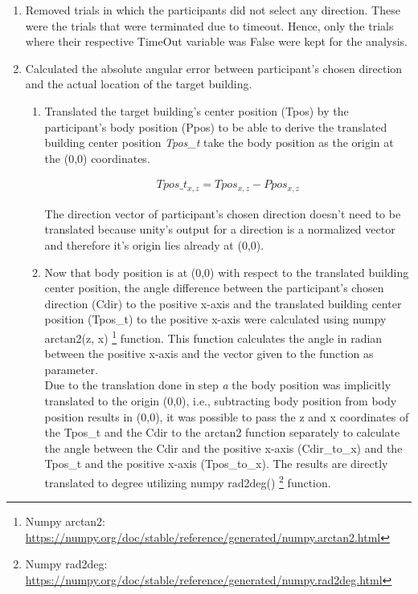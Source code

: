\begin{enumerate}
	\item Removed trials in which the participants did not select any direction. These were the trials that were terminated due to timeout. Hence, only the trials where their respective TimeOut variable was False were kept for the analysis.
	\item Calculated the absolute angular error between participant's chosen direction and the actual location of the target building.
	
	\begin{enumerate}
		\item Translated the target building's center position {\emphasize(Tpos)} by the participant's body position {\emphasize(Ppos)} to be able to derive the translated building center position {\emph{Tpos\_t}} take the body position as the origin at the (0,0) coordinates.
		
			\begin{align*}
				Tpos\_t_{x,z}= Tpos_{x,z} - Ppos_{x,z}
			\end{align*}
		
		The direction vector of participant's chosen direction doesn't need to be translated because unity's output for a direction is a normalized vector and therefore it's origin lies already at (0,0).\\
		
		\item Now that body position is at (0,0) with respect to the translated building center position, the angle difference between the participant's chosen direction {\emphasize(Cdir)} to the positive x-axis and the translated building center position {\emphasize(Tpos\_t)} to the positive x-axis were calculated using numpy arctan2(z, x) \footnote{Numpy arctan2: \href{https://numpy.org/doc/stable/reference/generated/numpy.arctan2.html}{https://numpy.org/doc/stable/reference/generated/numpy.arctan2.html}} function. This function calculates the angle in radian between the positive x-axis and the vector given to the function as parameter. \\
		Due to the translation done in step \emph{a} the body position was implicitly translated to the origin (0,0), i.e., subtracting body position from body position results in (0,0), it was possible to pass the z and x coordinates of the {\emphasize Tpos\_t} and the {\emphasize Cdir} to the arctan2 function separately to calculate the angle between the {\emphasize Cdir} and the positive x-axis {\emphasize (Cdir\_to\_x)} and the {\emphasize Tpos\_t} and the positive x-axis {\emphasize (Tpos\_to\_x)}. The results are directly translated to degree utilizing numpy rad2deg() \footnote{Numpy rad2deg: \href{https://numpy.org/doc/stable/reference/generated/numpy.rad2deg.html}{https://numpy.org/doc/stable/reference/generated/numpy.rad2deg.html}} function.
	

\end{enumerate}
\end{enumerate}
